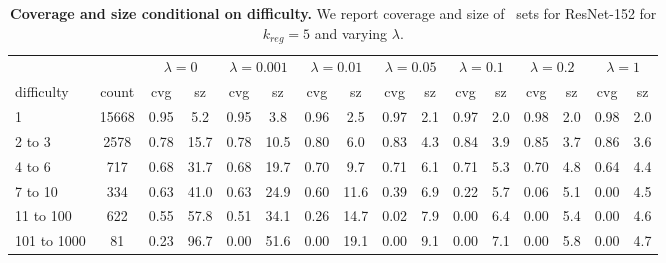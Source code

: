 \begin{table}[t]
\centering
\tiny
\begin{tabular}{lccccccccccccccc} 
\toprule
       &  & \multicolumn{2}{c}{$\lambda={0}$}     & \multicolumn{2}{c}{$\lambda={0.001}$}     & \multicolumn{2}{c}{$\lambda={0.01}$}     & \multicolumn{2}{c}{$\lambda={0.05}$}     & \multicolumn{2}{c}{$\lambda={0.1}$}     & \multicolumn{2}{c}{$\lambda={0.2}$}     & \multicolumn{2}{c}{$\lambda={1}$}    \\ 
         \cmidrule(r){3-4}     \cmidrule(r){5-6}     \cmidrule(r){7-8}     \cmidrule(r){9-10}     \cmidrule(r){11-12}     \cmidrule(r){13-14}     \cmidrule(r){15-16}    
difficulty & count & cvg & sz    & cvg & sz    & cvg & sz    & cvg & sz    & cvg & sz    & cvg & sz    & cvg & sz    \\ 
\midrule 
1      & 15668  & 0.95 & 5.2   & 0.95 & 3.8   & 0.96 & 2.5   & 0.97 & 2.1   & 0.97 & 2.0   & 0.98 & 2.0   & 0.98 & 2.0  \\ 
2 to 3      & 2578  & 0.78 & 15.7   & 0.78 & 10.5   & 0.80 & 6.0   & 0.83 & 4.3   & 0.84 & 3.9   & 0.85 & 3.7   & 0.86 & 3.6  \\ 
4 to 6      & 717  & 0.68 & 31.7   & 0.68 & 19.7   & 0.70 & 9.7   & 0.71 & 6.1   & 0.71 & 5.3   & 0.70 & 4.8   & 0.64 & 4.4  \\ 
7 to 10      & 334  & 0.63 & 41.0   & 0.63 & 24.9   & 0.60 & 11.6   & 0.39 & 6.9   & 0.22 & 5.7   & 0.06 & 5.1   & 0.00 & 4.5  \\ 
11 to 100      & 622  & 0.55 & 57.8   & 0.51 & 34.1   & 0.26 & 14.7   & 0.02 & 7.9   & 0.00 & 6.4   & 0.00 & 5.4   & 0.00 & 4.6  \\ 
101 to 1000      & 81  & 0.23 & 96.7   & 0.00 & 51.6   & 0.00 & 19.1   & 0.00 & 9.1   & 0.00 & 7.1   & 0.00 & 5.8   & 0.00 & 4.7  \\ 
\bottomrule
\end{tabular}
\caption{\textbf{Coverage and size conditional on difficulty.} We report coverage and size of \raps\ sets for ResNet-152 for $k_{reg}=5$ and varying $\lambda$.}
\label{table:difficulty}
\end{table}
